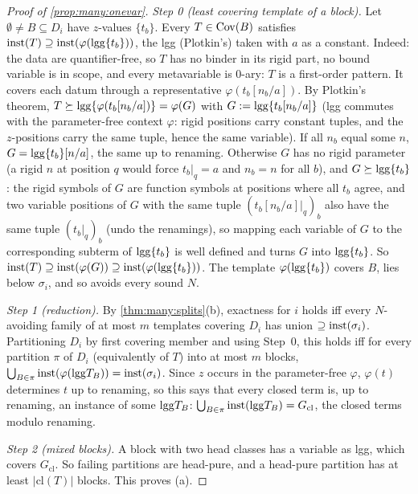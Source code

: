 \begin{proof}[Proof of \cref{prop:many:onevar}]
\emph{Step 0 (least covering template of a block).} Let $\emptyset\neq B\subseteq D_i$ have $z$-values $\{t_b\}$. Every
$T\in\mathrm{Cov}(B)$ satisfies $\mathrm{inst}(T)\supseteq\mathrm{inst}(\varphi(\mathrm{lgg}\{t_b\}))$, the lgg (Plotkin's) taken with $a$ as a constant.
Indeed: the data are quantifier-free, so $T$ has no binder in its rigid part, no bound variable is in scope, and every
metavariable is 0-ary: $T$ is a first-order pattern. It covers each datum through a representative
$\varphi(t_b[n_b/a])$. By Plotkin's theorem, $T\succeq\mathrm{lgg}\{\varphi(t_b[n_b/a])\}=\varphi(G)$ with $G:=\mathrm{lgg}\{t_b[n_b/a]\}$ (lgg
commutes with the parameter-free context $\varphi$: rigid positions carry constant tuples, and the $z$-positions carry the
same tuple, hence the same variable). If all $n_b$ equal some $n$, $G=\mathrm{lgg}\{t_b\}[n/a]$, the same up to renaming.
Otherwise $G$ has no rigid parameter (a rigid $n$ at position $q$ would force $t_b|_q=a$ and $n_b=n$ for all $b$), and
$G\succeq\mathrm{lgg}\{t_b\}$: the rigid symbols of $G$ are function symbols at positions where all $t_b$ agree, and two variable
positions of $G$ with the same tuple $(t_b[n_b/a]|_q)_b$ also have the same tuple $(t_b|_q)_b$ (undo the renamings), so
mapping each variable of $G$ to the corresponding subterm of $\mathrm{lgg}\{t_b\}$ is well defined and turns $G$ into
$\mathrm{lgg}\{t_b\}$. So $\mathrm{inst}(T)\supseteq\mathrm{inst}(\varphi(G))\supseteq\mathrm{inst}(\varphi(\mathrm{lgg}\{t_b\}))$. The template
$\varphi(\mathrm{lgg}\{t_b\})$ covers $B$, lies below $\sigma_i$, and so avoids every sound $N$.

\emph{Step 1 (reduction).} By \cref{thm:many:splits}(b), exactness for $i$ holds iff every $N$-avoiding family of at most
$m$ templates covering $D_i$ has union $\supseteq\mathrm{inst}(\sigma_i)$. Partitioning $D_i$ by first covering member and using
Step~0, this holds iff for every partition $\pi$ of $D_i$ (equivalently of $T$) into at most $m$ blocks,
$\bigcup_{B\in\pi}\mathrm{inst}(\varphi(\mathrm{lgg} T_B))=\mathrm{inst}(\sigma_i)$. Since $z$ occurs in the parameter-free $\varphi$, $\varphi(t)$
determines $t$ up to renaming, so this says that every closed term is, up to renaming, an instance of some $\mathrm{lgg} T_B$:
$\bigcup_{B\in\pi}\mathrm{inst}(\mathrm{lgg} T_B)=G_{\mathrm{cl}}$, the closed terms modulo renaming.

\emph{Step 2 (mixed blocks).} A block with two head classes has a variable as lgg, which covers $G_{\mathrm{cl}}$. So
failing partitions are head-pure, and a head-pure partition has at least $|\mathrm{cl}(T)|$ blocks. This proves (a).


\end{proof}
